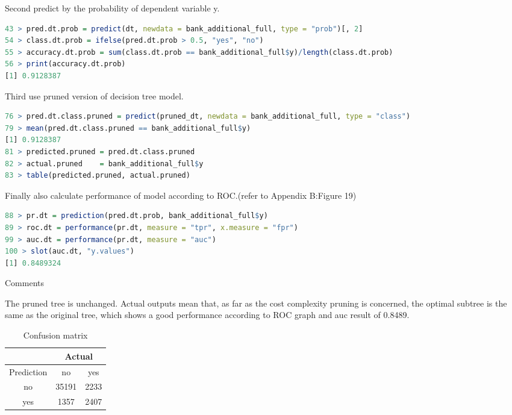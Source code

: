 \documentclass[12pt, a4paper, bibliography=totoc, english]{scrartcl}
\begin{document}
Second predict by the probability of dependent variable y.

\begin{lstlisting}[language = R]
43 > pred.dt.prob = predict(dt, newdata = bank_additional_full, type = "prob")[, 2]  
54 > class.dt.prob = ifelse(pred.dt.prob > 0.5, "yes", "no")
55 > accuracy.dt.prob = sum(class.dt.prob == bank_additional_full$y)/length(class.dt.prob)
56 > print(accuracy.dt.prob)
[1] 0.9128387
\end{lstlisting}

Third use pruned version of decision tree model.

\begin{lstlisting}[language = R]
76 > pred.dt.class.pruned = predict(pruned_dt, newdata = bank_additional_full, type = "class")
79 > mean(pred.dt.class.pruned == bank_additional_full$y)
[1] 0.9128387
81 > predicted.pruned = pred.dt.class.pruned
82 > actual.pruned    = bank_additional_full$y
83 > table(predicted.pruned, actual.pruned)
\end{lstlisting}

Finally also calculate performance of model according to ROC.(refer to Appendix B:Figure 19)


\begin{lstlisting}[language = R]
88 > pr.dt = prediction(pred.dt.prob, bank_additional_full$y)
89 > roc.dt = performance(pr.dt, measure = "tpr", x.measure = "fpr")  
99 > auc.dt = performance(pr.dt, measure = "auc")
100 > slot(auc.dt, "y.values")
[1] 0.8489324
\end{lstlisting}

\textbullet\quad Comments

The pruned tree is unchanged. Actual outputs mean that, as far as the cost complexity pruning is concerned, the optimal subtree is the same as the original tree, which shows a good performance according to ROC graph and auc result of 0.8489.
\begin{table}[!hbp]
	\centering
	\begin{tabular}{|c|c|c|}
		\hline
		&\multicolumn{2}{|c|}{Actual} \\
		\hline
		Prediction & no & yes  \\
		\hline
		no & 35191 & 2233 \\
		\hline
		yes & 1357 & 2407 \\
		\hline
	\end{tabular}
	\caption{Confusion matrix} 
\end{table}
\end{document}
